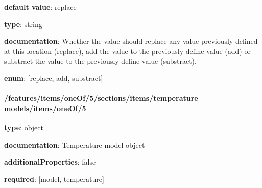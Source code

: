 \begin{itemized}
\item {\bf default value}: replace
\item {\bf type}: string
\item {\bf documentation}: Whether the value should replace any value previously defined at this location (replace), add the value to the previously define value (add) or substract the value to the previously define value (substract).
\item {\bf enum}: [replace, add, substract]\end{itemized}\paragraph{/features/items/oneOf/5/sections/items/temperature models/items/oneOf/5} \begin{itemized}
\item {\bf type}: object
\item {\bf documentation}: Temperature model object
\item {\bf additionalProperties}: false
\item {\bf required}: [model, temperature]\end{itemized}
